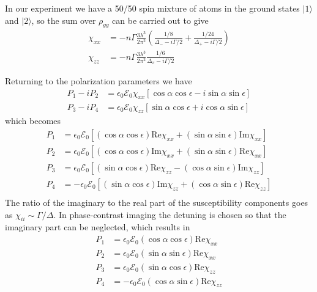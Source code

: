 \documentclass[11pt,letter]{article}
\newcommand{\efieldo}{\ensuremath{\mathcal{E}_{0}}}
\begin{document}
In our experiment we have a 50/50 spin mixture of atoms in the ground states
$|1\rangle$ and $|2\rangle$,  so the sum over $\rho_{gg}$ can be carried out to
give 
\begin{equation}
\begin{split}
   \chi_{xx} & = - n  
       \Gamma\frac{ 3  \lambda^{3}}{2 \pi^{2}} 
       \left( \frac{1/8}{\Delta_{-} - i \Gamma/2 } 
       +  
              \frac{1/24}{\Delta_{+} - i \Gamma/2 }  
       \right)  \\
   \chi_{zz} & = - n
       \Gamma\frac{ 3 \lambda^{3}}{2 \pi^{2}} 
              \frac{1/6}{\Delta_{\pi} - i \Gamma/2 } 
\end{split}
\end{equation}

Returning to the polarization parameters we have 
\begin{equation}
\begin{split}
  P_{1} - i P_{2} & = \epsilon_{0} \efieldo \chi_{xx}
      [\cos\alpha \cos \epsilon - i \sin\alpha\sin\epsilon] \\
  P_{3} - i P_{4} & = \epsilon_{0} \efieldo \chi_{zz} 
      [\sin\alpha \cos\epsilon + i \cos\alpha\sin\epsilon]
\end{split}
\end{equation}
which becomes
\begin{equation}
\begin{split}
  P_{1} &= \epsilon_{0} \efieldo[
            ( \cos\alpha\cos\epsilon ) \text{Re}\chi_{xx}
          + ( \sin\alpha\sin\epsilon ) \text{Im}\chi_{xx} ]\\ 
  P_{2} &= \epsilon_{0} \efieldo[
            ( \cos\alpha\cos\epsilon ) \text{Im}\chi_{xx} 
          + ( \sin\alpha\sin\epsilon ) \text{Re}\chi_{xx} ]\\ 
  P_{3} &= \epsilon_{0} \efieldo[
            ( \sin\alpha\cos\epsilon ) \text{Re}\chi_{zz}
          - ( \cos\alpha\sin\epsilon ) \text{Im}\chi_{zz} ]\\
  P_{4} &= -\epsilon_{0} \efieldo[
            ( \sin\alpha\cos\epsilon ) \text{Im}\chi_{zz} 
          + ( \cos\alpha\sin\epsilon ) \text{Re}\chi_{zz} ]\\ 
\end{split}
\end{equation}
The ratio of the imaginary to the real part of the susceptibility components
goes as $\chi_{ii} \sim \Gamma / \Delta$.  In phase-contrast imaging the
detuning is chosen so that the imaginary part  can be neglected, which results
in
\begin{equation}
\begin{split}
  P_{1} &= \epsilon_{0} \efieldo
            ( \cos\alpha\cos\epsilon ) \text{Re}\chi_{xx} \\
  P_{2} &= \epsilon_{0} \efieldo
           ( \sin\alpha\sin\epsilon ) \text{Re}\chi_{xx} \\ 
  P_{3} &= \epsilon_{0} \efieldo
            ( \sin\alpha\cos\epsilon ) \text{Re}\chi_{zz} \\
  P_{4} &= -\epsilon_{0} \efieldo
           ( \cos\alpha\sin\epsilon ) \text{Re}\chi_{zz} \\ 
\end{split}
\end{equation}
\end{document}
